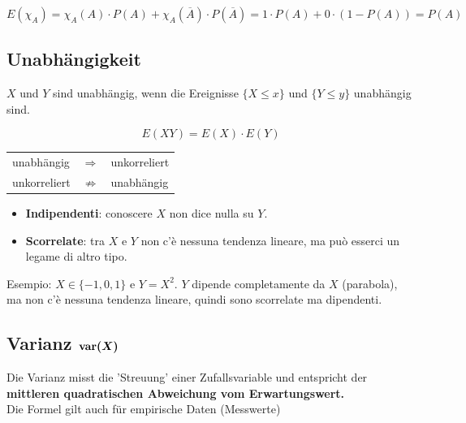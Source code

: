 \vspace{0.2cm}


\vspace{0.1cm}

$ E(\chi_A )=  \chi_A(A) \cdot P(A) + \chi_A(\overline{A}) \cdot P(\overline{A}) = 1 \cdot P(A) + 0 \cdot (1- P(A)) = P(A) $


\subsection{Unabhängigkeit}

$X$ und $Y$ sind unabhängig, wenn die Ereignisse $\{ X \leq x \} $ und $\{ Y \leq y \} $ unabhängig sind.

\vspace{0.2cm}

\begin{minipage}[c]{0.48\columnwidth}
	\begin{center}
	\end{center}
	$$ \boxed{ E(XY) = E(X) \cdot E(Y) }$$
\end{minipage}
\hfill
\begin{minipage}[c]{0.48\columnwidth}
	\begin{tabular}{lcl}
		unabhängig		& $\Rightarrow$		& unkorreliert	\\
		unkorreliert 	& $\nRightarrow$ 	& unabhängig
	\end{tabular}
\end{minipage}\vspace{1em}
\begin{itemize}
	\item \textbf{Indipendenti}: conoscere $X$ non dice nulla su $Y$.
	\item \textbf{Scorrelate}: tra $X$ e $Y$ non c'è nessuna tendenza lineare, ma può esserci un legame di altro tipo.
\end{itemize}

Esempio: $X \in \{-1, 0, 1\}$ e $Y = X^2$. $Y$ dipende completamente da $X$ (parabola), ma non c'è nessuna tendenza lineare, quindi sono scorrelate ma dipendenti.

\subsection[Varianz]{Varianz $\bm{\mathrm{var}(X)}$}

Die Varianz misst die 'Streuung' einer Zufallsvariable und entspricht der \textbf{mittleren quadratischen Abweichung vom Erwartungswert.} \\
Die Formel gilt auch für empirische Daten (Messwerte)

